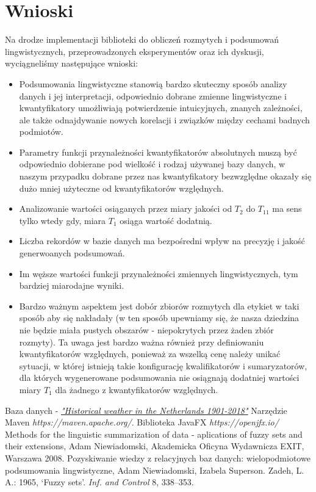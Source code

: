 \documentclass{classrep}
\begin{document}
\section{Wnioski}
Na drodze implementacji biblioteki do obliczeń rozmytych i podsumowań lingwistycznych, przeprowadzonych eksperymentów oraz ich dyskusji, wyciągneliśmy następujące wnioski:
\begin{itemize}[label=$\bullet$\scshape\bfseries]
\item Podsumowania lingwistyczne stanowią bardzo skuteczny sposób analizy danych i jej interpretacji, odpowiednio dobrane zmienne lingwistyczne i kwantyfikatory umożliwiają potwierdzenie intuicyjnych, znanych zależności, ale także odnajdywanie nowych korelacji i związków między cechami badnych podmiotów.
\item Parametry funkcji przynależności kwantyfikatorów absolutnych muszą być odpowiednio dobierane pod wielkość i rodzaj używanej bazy danych, w naszym przypadku dobrane przez nas kwantyfikatory bezwzględne okazały się dużo mniej użyteczne od kwantyfikatorów względnych.
\item Analizowanie wartości osiąganych przez miary jakości od $T_2$ do $T_{11}$ ma sens tylko wtedy gdy, miara $T_1$ osiąga wartość dodatnią.
\item Liczba rekordów w bazie danych ma bezpośredni wpływ na precyzję i jakość generwoanych podsumowań.
\item Im węższe wartości funkcji przynależności zmiennych lingwistycznych, tym bardziej miarodajne wyniki.
\item Bardzo ważnym aspektem jest dobór zbiorów rozmytych dla etykiet w taki sposób aby się nakładały (w ten sposób upewniamy się, że nasza dziedzina nie będzie miała pustych obszarów - niepokrytych przez żaden zbiór rozmyty). Ta uwaga jest bardzo ważna również przy definiowaniu kwantyfikatorów względnych, ponieważ za wszelką cenę należy unikać sytuacji, w której istnieją takie konfigurację kwalifikatorów i sumaryzatorów, dla których wygenerowane podsumowania nie osiągnają dodatniej wartości miary $T_1$ dla żadnego z kwantyfikatorów względnych.
\end{itemize}


\begin{thebibliography}{5}
Baza danych - 
\href{https://www.kaggle.com/sinaasappel/historical-weather-in-the-netherlands-19012018}{\textit{"Historical weather in the Netherlands 1901-2018"}}
Narzędzie Maven\newline
\textit{https://maven.apache.org/}. 
Biblioteka JavaFX\newline
\textit{https://openjfx.io/}
Methods for the linguistic summarization of data - aplications of fuzzy sets and their extensions, Adam Niewiadomski, Akademicka Oficyna Wydawnicza EXIT, Warszawa 2008.
Pozyskiwanie wiedzy z relacyjnych baz danych: wielopodmiotowe podsumowania lingwistyczne, Adam Niewiadomski, Izabela Superson.
Zadeh, L. A.: 1965, ‘Fuzzy sets’.  \textit{Inf. and Control} 8, 338–353.
\end{thebibliography}
\end{document}
